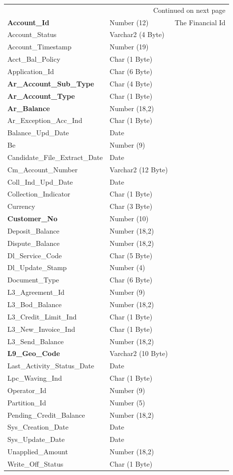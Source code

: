 \documentclass[12pt,twoside]{article}
\begin{document}
\begin{longtable}{l|l|l}
\hline
\endhead
\hline\multicolumn{3}{r}{Continued on next page} \\
\endfoot
\endlastfoot
\hline
\textbf{Account\_Id} & Number (12) & The Financial Id\\
Account\_Status & Varchar2 (4 Byte) & \\
Account\_Timestamp & Number (19) & \\
Acct\_Bal\_Policy & Char (1 Byte) & \\
Application\_Id & Char (6 Byte) & \\
\textbf{Ar\_Account\_Sub\_Type} & Char (4 Byte) & \\
\textbf{Ar\_Account\_Type} & Char (1 Byte) & \\
\textbf{Ar\_Balance} & Number (18,2) & \\
Ar\_Exception\_Acc\_Ind & Char (1 Byte) & \\
Balance\_Upd\_Date & Date & \\
Be & Number (9) & \\
Candidate\_File\_Extract\_Date & Date & \\
Cm\_Account\_Number & Varchar2 (12 Byte) & \\
Coll\_Ind\_Upd\_Date & Date & \\
Collection\_Indicator & Char (1 Byte) & \\
Currency & Char (3 Byte) & \\
\textbf{Customer\_No} & Number (10) & \\
Deposit\_Balance & Number (18,2) & \\
Dispute\_Balance & Number (18,2) & \\
Dl\_Service\_Code & Char (5 Byte) & \\
Dl\_Update\_Stamp & Number (4) & \\
Document\_Type & Char (6 Byte) & \\
L3\_Agreement\_Id & Number (9) & \\
L3\_Bod\_Balance & Number (18,2) & \\
L3\_Credit\_Limit\_Ind & Char (1 Byte) & \\
L3\_New\_Invoice\_Ind & Char (1 Byte) & \\
L3\_Send\_Balance & Number (18,2) & \\
\textbf{L9\_Geo\_Code} & Varchar2 (10 Byte) & \\
Last\_Activity\_Status\_Date & Date & \\
Lpc\_Waving\_Ind & Char (1 Byte) & \\
Operator\_Id & Number (9) & \\
Partition\_Id & Number (5) & \\
Pending\_Credit\_Balance & Number (18,2) & \\
Sys\_Creation\_Date & Date & \\
Sys\_Update\_Date & Date & \\
Unapplied\_Amount & Number (18,2) & \\
Write\_Off\_Status & Char (1 Byte) & \\
\hline
\end{longtable}
\normalsize
\end{document}
